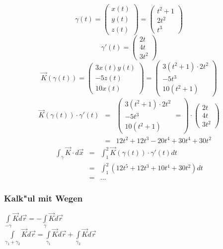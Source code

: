 \documentclass[10pt, a4paper, twocolumn]{scrartcl}
\begin{document}
$$\gamma(t)=\left(
\begin{array}{c}
 x(t)\\
 y(t)\\
 z(t)
\end{array}\right)=\left(
\begin{array}{c}
 t^2+1\\
 2t^2\\
 t^3
\end{array}\right)$$
$$\gamma'(t)=\left(
\begin{array}{c}
 2t\\
 4t\\
 3t^2
\end{array}
\right)$$
$$\vec{K}(\gamma (t))=\left (
\begin{array}{c}
 3x(t)y(t)\\
 -5z(t)\\
 10x(t)
\end{array}
\right )=\left (
\begin{array}{c}
 3(t^2+1)\cdotp 2t^2\\
 -5t^3\\
 10(t^2+1)
\end{array}
\right )$$
\begin{eqnarray}
\vec{K}(\gamma(t))\cdotp\gamma'(t)& =& \left (
\begin{array}{c}
 3(t^2+1)\cdotp 2t^2\\
 -5t^3\\
 10(t^2+1)
\end{array}=\right)\cdotp \left(
\begin{array}{c}
 2t\\
 4t\\
 3t^2
\end{array}
\right )\nonumber\\
&=& 12t^2+12t^3-20t^4+30t^4+30t^2\nonumber
\end{eqnarray}
\begin{eqnarray}
 \int_\gamma \vec{K}\cdotp d\vec{x}& 	=&	\int^2_1 \vec{K}(\gamma(t))\cdotp\gamma'(t)dt\nonumber\\
 &					=&	\int^2_1 (12t^5+12t^3+10t^4+30t^2)dt\nonumber\\
 &					=&	\ldots\nonumber
\end{eqnarray}

\subsubsection{Kalk"ul mit Wegen}

$\int\limits_{-\gamma}\vec{K}d\vec{r}=-\int\limits_{\gamma}\vec{K}d\vec{r}$\\
$\int\limits_{\gamma_1+\gamma_2}\vec{K}d\vec{r}=\int\limits_{\gamma_1}\vec{K}d\vec{r}+\int\limits_{\gamma_2}\vec{K}d\vec{r}$
\end{document}
